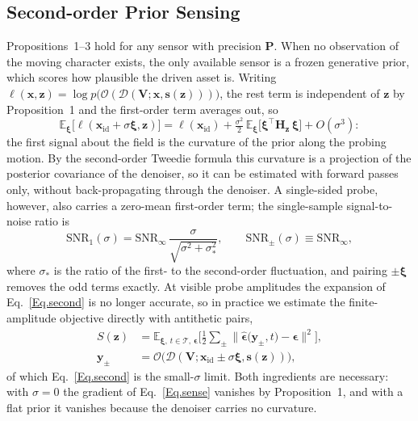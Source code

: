 \documentclass[lettersize,journal]{IEEEtran}
\newenvironment{revblock}{\par\color{red}}{\par}
\begin{document}
\begin{revblock}
\subsection{Second-order Prior Sensing} \label{sec:sensor}
Propositions~1--3 hold for any sensor with precision $\bm{P}$. When no observation of the
moving character exists, the only available sensor is a frozen generative prior, which scores
how plausible the driven asset is. Writing $\ell(\bm{x},\bm{z})=\log p\big(\mathcal{O}(
\mathcal{D}(\bm{V};\bm{x},\bm{s}(\bm{z})))\big)$, the rest term is independent of $\bm{z}$ by
Proposition~1 and the first-order term averages out, so
\begin{equation} \label{Eq.second}
\mathbb{E}_{\bm{\xi}}\big[\ell(\bm{x}_{\text{id}}+\sigma\bm{\xi},\bm{z})\big]=
\ell(\bm{x}_{\text{id}})+\tfrac{\sigma^{2}}{2}\,\mathbb{E}_{\bm{\xi}}\big[\bm{\xi}^{\top}
\bm{H}_{\bm{z}}\,\bm{\xi}\big]+O(\sigma^{3}):
\end{equation}
the first signal about the field is the curvature of the prior along the probing motion. By the
second-order Tweedie formula \cite{meng2021estimating,manor2024posterior} this curvature is a
projection of the posterior covariance of the denoiser, so it can be estimated with forward
passes only, without back-propagating through the denoiser. A single-sided probe, however, also
carries a zero-mean first-order term; the single-sample signal-to-noise ratio is
\begin{equation} \label{Eq.snr}
\mathrm{SNR}_{1}(\sigma)=\mathrm{SNR}_{\infty}\,\frac{\sigma}{\sqrt{\sigma^{2}+\sigma_{\ast}^{2}}},
\qquad \mathrm{SNR}_{\pm}(\sigma)\equiv\mathrm{SNR}_{\infty},
\end{equation}
where $\sigma_{\ast}$ is the ratio of the first- to the second-order fluctuation, and pairing
$\pm\bm{\xi}$ \cite{salimans2017evolution} removes the odd terms exactly. At visible probe
amplitudes the expansion of Eq.~\ref{Eq.second} is no longer accurate, so in practice we
estimate the finite-amplitude objective directly with antithetic pairs,
\begin{equation} \label{Eq.sense}
\begin{aligned}
S(\bm{z})&=\mathbb{E}_{\bm{\xi},\,t\in\mathcal{T},\,\bm{\epsilon}}\Big[\tfrac{1}{2}\sum_{\pm}
\big\lVert\hat{\bm{\epsilon}}\big(\bm{y}_{\pm},t\big)-\bm{\epsilon}\big\rVert^{2}\Big],\\
\bm{y}_{\pm}&=\mathcal{O}\big(\mathcal{D}(\bm{V};\bm{x}_{\text{id}}\pm\sigma\bm{\xi},\bm{s}(\bm{z}))\big),
\end{aligned}
\end{equation}
of which Eq.~\ref{Eq.second} is the small-$\sigma$ limit. Both ingredients are necessary: with
$\sigma=0$ the gradient of Eq.~\ref{Eq.sense} vanishes by Proposition~1, and with a flat prior it
vanishes because the denoiser carries no curvature.
\end{revblock}
\end{document}
